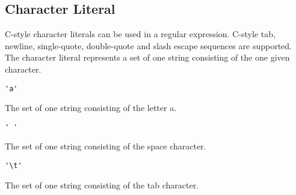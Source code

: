 
\subsection{Character Literal}
{
	C-style character literals can be used in a regular expression.
	C-style tab, newline, single-quote, double-quote and slash escape sequences
	are supported.
	The character literal represents a set of one string consisting of the one
	given character.
	
	\begin{itemize}
	{
		\item[] \lstinline[language=MAIA, columns=fixed]@'a'@
		
			The set of one string consisting of the letter a.
		
		\item[] \lstinline[language=MAIA, columns=fixed]@' '@
		
			The set of one string consisting of the space character.
		
		\item[] \lstinline[language=MAIA, columns=fixed]@'\t'@
		
			The set of one string consisting of the
			tab character.
	}
	\end{itemize}
}
